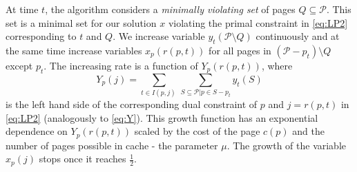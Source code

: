 \documentclass[11pt]{article}
\newcommand{\cP}{{\mathcal{P}}}
\begin{document}
At time $t$, the algorithm considers a {\em minimally violating set} of pages $Q \subseteq \cP$. This set is a minimal set for our solution $x$ violating the primal constraint in \eqref{eq:LP2} corresponding to $t$ and $Q$. %
We increase variable $y_{t}(\cP \setminus Q)$ continuously and at the same time increase variables $x_p(r(p,t))$ for all pages in $(\cP-p_t) \setminus Q$ except $p_t$. The increasing rate is a function of $Y_p(r(p,t))$, where %
\begin{equation}
	\label{eq:Y2}
	Y_p(j) =\sum_{t \in I(p,j)~} \sum_{S \subseteq \cP \big|p \in S-p_t} y_t(S)
\end{equation}  is the left hand side of the corresponding dual constraint of $p$ and $j = r(p,t)$ in \eqref{eq:LP2} (analogously to \eqref{eq:Y}). This growth function has an exponential dependence on $Y_p(r(p,t))$ scaled by the cost of the page $c(p)$ and the number of pages possible in cache - the parameter $\mu$. %
The growth of the variable $x_p(j)$ stops once it reaches $\frac{1}{2}$.   



\end{document}
